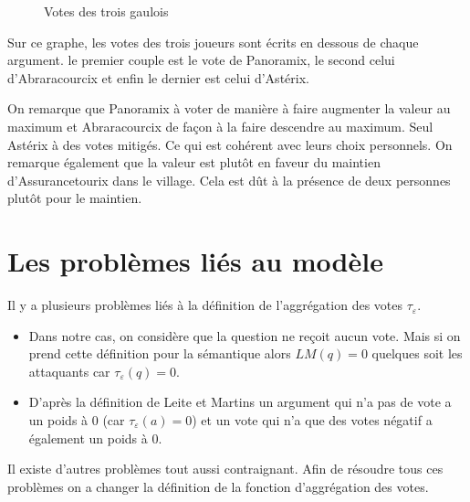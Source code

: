 \documentclass[11pt]{article}
\theoremstyle{defi}
\theoremstyle{not}
\theoremstyle{prob}
\begin{document}
\begin{figure}
      \caption{Votes des trois gaulois}
      \label{fig:votes_gaulois}
    \end{figure}

    Sur ce graphe, les votes des trois joueurs sont écrits en dessous de chaque argument. le premier couple est le vote de Panoramix, le second celui d'Abraracourcix et enfin le dernier est celui d'Astérix.

    On remarque que Panoramix à voter de manière à faire augmenter la valeur au maximum et Abraracourcix de façon à la faire descendre au maximum. Seul Astérix à des votes mitigés. Ce qui est cohérent avec leurs choix personnels.
    On remarque également que la valeur est plutôt en faveur du maintien d'Assurancetourix dans le village. Cela est dût à la présence de deux personnes plutôt pour le maintien.


  \section{Les problèmes liés au modèle}
    Il y a plusieurs problèmes liés à la définition de l'aggrégation des votes $\tau_\varepsilon$.
    \begin{itemize}
      \item Dans notre cas, on considère que la question ne reçoit aucun vote. Mais si on prend cette définition pour la sémantique alors $LM(q) = 0$ quelques soit les attaquants car $\tau_\varepsilon(q) = 0$.
      \item D'après la définition de Leite et Martins un argument qui n'a pas de vote a un poids à 0 (car $\tau_\varepsilon (a) = 0$) et un vote qui n'a que des votes négatif a également un poids à 0.
    \end{itemize}

    Il existe d'autres problèmes tout aussi contraignant. Afin de résoudre tous ces problèmes on a changer la définition de la fonction d'aggrégation des votes.
\end{document}
